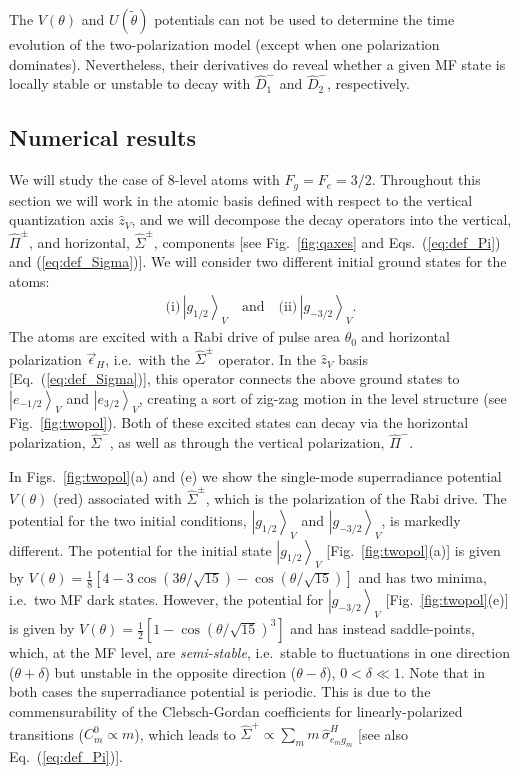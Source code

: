 \documentclass[aps,prx,superscriptaddress,twocolumn,notitlepage,nofootinbib,longbibliography]{revtex4-2}
\newcommand{\ket}[1]{\left|#1\right>}
\newcommand{\quv}{\hat{z}}
\begin{document}
The $V(\theta)$ and $U(\tilde\theta)$ potentials can not be used to determine the time evolution of the two-polarization model (except when one polarization dominates). Nevertheless, their derivatives do reveal whether a given MF state is locally stable or unstable to decay with $\hat{D}^-_1$ and $\hat{D}^-_2$, respectively. 





\subsection{Numerical results}

We will study the case of 8-level atoms with $F_g=F_e=3/2$.
Throughout this section we will work in the atomic basis defined with respect to the vertical quantization axis $\quv_V$, and we will decompose the decay operators into the vertical, $\hat{\Pi}^\pm$, and horizontal, $\hat{\Sigma}^\pm$, components [see Fig.~\ref{fig:qaxes} and Eqs.~(\ref{eq:def_Pi}) and (\ref{eq:def_Sigma})].
We will consider two different initial ground states for the atoms:
\begin{align}
\text{(i)}\,\ket{g_{1/2}}_V \quad \text{and}\quad\text{(ii)}\, \ket{g_{-3/2}}_V.
\label{eq:ICs_8level_2pol}
\end{align}
The atoms are excited with a Rabi drive of pulse area $\theta_0$ and horizontal polarization $\vec{\epsilon}_H$, i.e.~with the $\hat{\Sigma}^\pm$ operator. In the $\quv_V$ basis [Eq.~(\ref{eq:def_Sigma})], this operator connects the above ground states to $\ket{e_{-1/2}}_V$ and $\ket{e_{3/2}}_V$, creating a sort of zig-zag motion in the level structure (see Fig.~\ref{fig:twopol}). Both of these excited states can decay via the horizontal polarization, $\hat{\Sigma}^-$, as well as through the vertical polarization, $\hat{\Pi}^-$.

In Figs.~\ref{fig:twopol}(a) and (e)  we show the single-mode superradiance potential $V(\theta)$ (red) associated with $\hat{\Sigma}^\pm$, which is the polarization of the Rabi drive. The potential for the two initial conditions, $\ket{g_{1/2}}_V$ and $\ket{g_{-3/2}}_V$, is markedly different.
The potential for the initial state $\ket{g_{1/2}}_V$ [Fig.~\ref{fig:twopol}(a)] is given by $V(\theta) = \frac{1}{8} [4 - 3 \cos(3\theta/\sqrt{15}) - \cos(\theta /\sqrt{15})]$ and has two minima, i.e.~two MF dark states. However, the potential for $\ket{g_{-3/2}}_V$ [Fig.~\ref{fig:twopol}(e)] is given by $V(\theta)=\frac{1}{2} [1 - \cos(\theta/\sqrt{15})^3]$ and has instead saddle-points, which, at the MF level, are \emph{semi-stable}, i.e.~stable to fluctuations in one direction ($\theta+\delta$) but unstable in the opposite direction ($\theta-\delta$), $0<\delta\ll1$.
Note that in both cases the superradiance potential is periodic. This is due to the commensurability of the Clebsch-Gordan coefficients for linearly-polarized transitions ($C^0_m \propto m$), which leads to $\hat{\Sigma}^+\propto\sum_m m\, \hat{\sigma}^H_{e_mg_m}$ [see also Eq.~(\ref{eq:def_Pi})].
\end{document}
